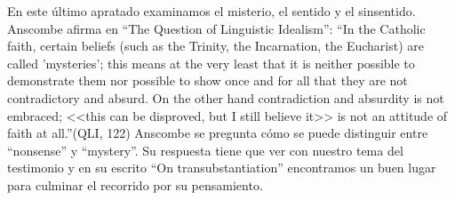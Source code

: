 \documentclass[../main.tex]{subfiles}
\begin{document}
En este último apratado examinamos el misterio, el sentido y el sinsentido. Anscombe afirma en ``The Question of Linguistic Idealism'': ``In the Catholic faith, certain beliefs (such as the Trinity, the Incarnation, the Eucharist) are called 'mysteries'; this means at the very least that it is neither possible to demonstrate them nor possible to show once and for all that they are not contradictory and absurd. On the other hand contradiction and absurdity is not embraced; <<this can be disproved, but I still believe it>> is not an attitude of faith at all.''(QLI, 122) Anscombe se pregunta cómo se puede distinguir entre ``nonsense'' y ``mystery''. Su respuesta tiene que ver con nuestro tema del testimonio y en su escrito ``On transubstantiation'' encontramos un buen lugar para culminar el recorrido por su pensamiento.
\end{document}
